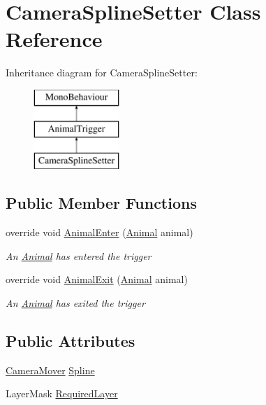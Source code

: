 \hypertarget{class_camera_spline_setter}{}\section{Camera\+Spline\+Setter Class Reference}
\label{class_camera_spline_setter}
Inheritance diagram for Camera\+Spline\+Setter\+:\begin{figure}[H]
\begin{center}
\leavevmode
\includegraphics[height=3.000000cm]{class_camera_spline_setter}
\end{center}
\end{figure}
\subsection*{Public Member Functions}
\begin{DoxyCompactItemize}
\item 
override void \mbox{\hyperlink{class_camera_spline_setter_a5669e29495356c82377ef7545cf29b3a}{Animal\+Enter}} (\mbox{\hyperlink{class_animal}{Animal}} animal)
\begin{DoxyCompactList}\small\item\em An \mbox{\hyperlink{class_animal}{Animal}} has entered the trigger \end{DoxyCompactList}\item 
override void \mbox{\hyperlink{class_camera_spline_setter_a4b75777822bf9b381e8a95c11d979e31}{Animal\+Exit}} (\mbox{\hyperlink{class_animal}{Animal}} animal)
\begin{DoxyCompactList}\small\item\em An \mbox{\hyperlink{class_animal}{Animal}} has exited the trigger \end{DoxyCompactList}\end{DoxyCompactItemize}
\subsection*{Public Attributes}
\begin{DoxyCompactItemize}
\item 
\mbox{\hyperlink{class_camera_mover}{Camera\+Mover}} \mbox{\hyperlink{class_camera_spline_setter_a2aa70cc75ebbb8198812b7c3be4a13cf}{Spline}}
\item 
Layer\+Mask \mbox{\hyperlink{class_camera_spline_setter_ab63103e62e61cda51e37e56c13f786cb}{Required\+Layer}}
\end{DoxyCompactItemize}
